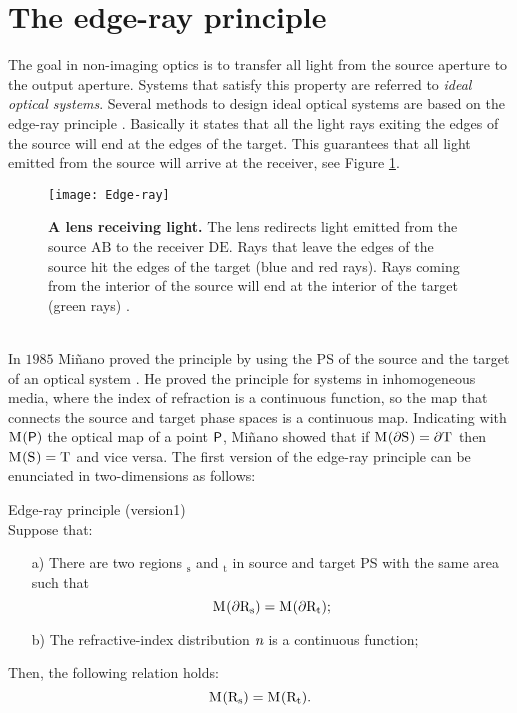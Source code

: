 \section{The edge-ray principle}
The goal in non-imaging optics is to transfer all light from the source aperture to the output aperture. Systems that satisfy this property are referred to \textit{ideal optical systems}.
Several methods to design ideal optical systems are based on the edge-ray principle \cite{welford1978problem, benitez1997design}. 
Basically it states that all the light rays exiting the edges of the source will end at the edges of the target. 
This guarantees that all light emitted from the source will arrive at the receiver, see Figure \ref{fig:edge}. 
 \begin{figure}[h]
  \begin{center}
  \texttt{[image: Edge-ray]}
  \end{center}
  \caption{\textbf{A lens receiving light.} The lens redirects light emitted from the source $\textrm{A}\textrm{B}$ to the receiver $\textrm{D}\textrm{E}$. 
Rays that leave the edges of the source hit the edges of the target (blue and red rays). Rays coming from the interior of the source will end at the interior of the target (green rays) \cite{wiki2}.}
  \label{fig:edge}
\end{figure}
\\ \indent
In $1985$ Mi{\~n}ano proved the principle by using the PS of the source and the target of an optical system \cite{minano1985two, minano1986design}. He proved the principle for systems in inhomogeneous media, where the index of refraction is a continuous function, so the map that connects the source and target phase spaces is a continuous map.
Indicating with $\mathrm{M}_{\textit{}}(\textsf{P})$ the optical map of a point $\textsf{P}$, Mi{\~n}ano showed that if $\mathrm{M}_{\textit{}}(\partial\mbox{$\textup{S}_{\textit{}}$})=\partial\mbox{$\textup{T}_{\textit{}}$}$ then 
$\mathrm{M}_{\textit{}}(\mbox{$\textup{S}_{\textit{}}$})=\mbox{$\textup{T}_{\textit{}}$}$ and vice versa. 
The first version of the edge-ray principle \cite{minano1986design} can be enunciated in two-dimensions as follows:
\begin{lemma}{Edge-ray principle (version1)}\\ 
Suppose that:
\begin{itemize}
\item[a)] There are two regions $_\textrm{s}$ and $_\textrm{t}$ in source and target PS with the same area such that 
$$\mathrm{M}_{\textit{}}(\partial\mbox{$\textup{R}$}_\textrm{s}) = \mathrm{M}_{\textit{}}(\partial\mbox{$\textup{R}$}_\textrm{t});$$ 
\item[b)] The refractive-index distribution $\textit{n}$ is a continuous function; 
\end{itemize}
Then, the following relation holds: $$\mathrm{M}_{\textit{}}(\mbox{$\textup{R}$}_\textrm{s}) = \mathrm{M}_{\textit{}}(\mbox{$\textup{R}$}_\textrm{t}).$$
\end{lemma} 
